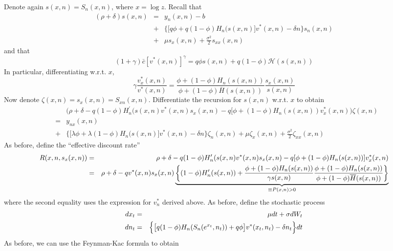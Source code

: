Denote again $s(x,n) = S_n(x,n)$, where $x = \log z$. Recall that
\begin{eqnarray*}
(\rho+\delta) s(x,n) &=& y_n(x,n) - b \\
&+& \Big\{ \big[q \phi + q (1-\phi) H_n(s(x,n) \big] v^*(x,n) - \delta n\Big\}
s_n(x,n) \\
&+& \mu s_x(x,n) + \frac{\sigma^2}{2} s_{xx}(x,n)
\end{eqnarray*}
and that
\begin{equation*}
(1+\gamma) \bar{c} [ v^*(x,n) ]^\gamma = q \phi s(x,n) + q(1-\phi) \mathcal{H}%
(s(x,n))
\end{equation*}
In particular, differentiating w.r.t. $x$,
\begin{equation*}
\gamma \frac{ v^*_x(x,n)}{v^*(x,n)} = \frac{\phi + (1-\phi) H_n(s(x,n))}{\phi
+ (1-\phi) \overline{H}(s(x,n))} \frac{s_x(x,n)}{s(x,n)}
\end{equation*}
Now denote $\zeta(x,n) = s_x(x,n) = S_{xn}(x,n)$. Differentiate the
recursion for $s(x,n)$ w.r.t. $x$ to obtain
\begin{eqnarray*}
&& \Bigg(\rho+ \delta - q (1-\phi) H_n^{\prime}(s(x,n) v^*(x,n)s_x(x,n) - q[
\phi + (1-\phi) H_n(s(x,n)) v_x^*(x,n) \Bigg) \zeta(x,n) \\
&=& y_{nx}(x,n) \\
&+& \Big\{ \big[\lambda \phi + \lambda (1-\phi) H_n(s(x,n) \big] v^*(x,n)-
\delta n\Big\} \zeta_n(x,n) + \mu \zeta_x(x,n) + \frac{\sigma^2}{2} \zeta_{xx}(x,n)
\end{eqnarray*}
As before, define the ``effective discount rate''
{\small
\begin{eqnarray*}
R(x,n, s_x(x,n)) &=& \rho+ \delta - q (1-\phi) H_n^{\prime}(s(x,n) v^*(x,n)
s_x(x,n) - q[ \phi + (1-\phi) H_n(s(x,n))] v_x^*(x,n) \\
&=& \rho+ \delta - q v^*(x,n) s_x(x,n) \underbrace{ \left\{ (1-\phi)
H_n^{\prime}(s(x,n)) + \frac{ \phi + (1-\phi) H_n(s(x,n))}{\gamma s(x,n)}\frac{%
\phi + (1-\phi) H_n(s(x,n))}{\phi + (1-\phi) \overline{H}(s(x,n))} \right\} }%
_{\equiv P(x,n) > 0}
\end{eqnarray*}}
where the second equality uses the expression for $v^*_n$ derived above. As
before, define the stochastic process
\begin{eqnarray}  \label{stoc_proc_3}
dx_t &=& \mu dt + \sigma dW_t  \notag \\
dn_t &=& \Big\{ \big[q (1-\phi) H_n(S_n(e^{x_t},n_t)) + q \phi \big] %
v^*(x_t,n_t) - \delta n_t \Big\} dt
\end{eqnarray}
As before, we can use the Feynman-Kac formula to obtain
